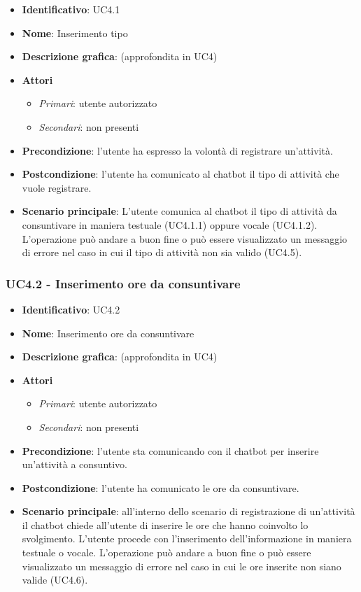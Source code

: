 \begin{itemize}
    \item \textbf{Identificativo}: UC4.1 
    \item \textbf{Nome}: Inserimento tipo  
    \item \textbf{Descrizione grafica}: (approfondita in UC4)
    \item \textbf{Attori}
        \begin{itemize} 
            \item \textit{Primari}: utente autorizzato
            \item \textit{Secondari}: non presenti
        \end{itemize}
    \item \textbf{Precondizione}: l'utente ha espresso la volontà di registrare un'attività. 
    \item \textbf{Postcondizione}: l'utente ha comunicato al chatbot il tipo di attività che vuole registrare. 
    \item \textbf{Scenario principale}: L'utente comunica al chatbot il tipo di attività da consuntivare in maniera testuale (UC4.1.1) oppure vocale (UC4.1.2). L'operazione può andare a buon fine o può essere visualizzato un messaggio di errore nel caso in cui il tipo di attività non sia valido (UC4.5).
\end{itemize}

\subsubsection{UC4.2 - Inserimento ore da consuntivare}
\begin{itemize}
    \item \textbf{Identificativo}: UC4.2 
    \item \textbf{Nome}: Inserimento ore da consuntivare  
    \item \textbf{Descrizione grafica}: (approfondita in UC4)
    \item \textbf{Attori}
        \begin{itemize} 
            \item \textit{Primari}: utente autorizzato
            \item \textit{Secondari}: non presenti
        \end{itemize}
    \item \textbf{Precondizione}: l'utente sta comunicando con il chatbot per inserire un'attività a consuntivo. 
    \item \textbf{Postcondizione}: l'utente ha comunicato le ore da consuntivare. 
    \item \textbf{Scenario principale}: all'interno dello scenario di registrazione di un'attività il chatbot chiede all'utente di inserire le ore che hanno coinvolto lo svolgimento. L'utente procede con l'inserimento dell'informazione in maniera testuale o vocale. L'operazione può andare a buon fine o può essere visualizzato un messaggio di errore nel caso in cui le ore inserite non siano valide (UC4.6).
\end{itemize}
\newpage

